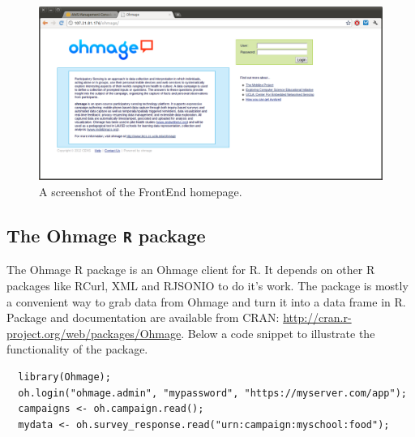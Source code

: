 \documentclass{scrartcl}
\begin{document}
\begin{figure}[h!]
\begin{center}
\includegraphics[width=15cm]{frontend.png}
\caption{A screenshot of the FrontEnd homepage.}
\label{fig:frontend}
\end{center}
\end{figure}

\subsection{The Ohmage \texttt{R} package}

The Ohmage R package is an Ohmage client for R. It depends on other R packages
like RCurl, XML and RJSONIO to do it's work. The package is mostly a convenient
way to grab data from Ohmage and turn it into a data frame in R. Package and
documentation are available from CRAN:
\url{http://cran.r-project.org/web/packages/Ohmage}. Below a code snippet to
illustrate the functionality of the package.

\begin{verbatim}
  library(Ohmage);
  oh.login("ohmage.admin", "mypassword", "https://myserver.com/app");
  campaigns <- oh.campaign.read();
  mydata <- oh.survey_response.read("urn:campaign:myschool:food");
\end{verbatim}
\end{document}
